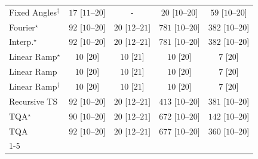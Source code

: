 \begin{tabular}{l|cccc|}
Fixed Angles$^\dagger$ & {\cellcolor[HTML]{F5FBF3}} \color[HTML]{000000} $17$ [$11$--$20$] & {\cellcolor[HTML]{000000}} \color[HTML]{F1F1F1} {\cellcolor{white}} \color{black} - & {\cellcolor[HTML]{F5FBF2}} \color[HTML]{000000} $20$ [$10$--$20$] & {\cellcolor[HTML]{EDF8EA}} \color[HTML]{000000} $59$ [$10$--$20$] \\
Fourier$^\star$ & {\cellcolor[HTML]{E7F6E3}} \color[HTML]{000000} $92$ [$10$--$20$] & {\cellcolor[HTML]{F5FBF2}} \color[HTML]{000000} $20$ [$12$--$21$] & {\cellcolor[HTML]{00441B}} \color[HTML]{F1F1F1} $781$ [$10$--$20$] & {\cellcolor[HTML]{79C67A}} \color[HTML]{000000} $382$ [$10$--$20$] \\
Interp.$^\star$ & {\cellcolor[HTML]{E7F6E3}} \color[HTML]{000000} $92$ [$10$--$20$] & {\cellcolor[HTML]{F5FBF2}} \color[HTML]{000000} $20$ [$12$--$21$] & {\cellcolor[HTML]{00441B}} \color[HTML]{F1F1F1} $781$ [$10$--$20$] & {\cellcolor[HTML]{79C67A}} \color[HTML]{000000} $382$ [$10$--$20$] \\
Linear Ramp$^\star$ & {\cellcolor[HTML]{F7FCF5}} \color[HTML]{000000} $10$ [$20$] & {\cellcolor[HTML]{F7FCF5}} \color[HTML]{000000} $10$ [$21$] & {\cellcolor[HTML]{F7FCF5}} \color[HTML]{000000} $10$ [$20$] & {\cellcolor[HTML]{F7FCF5}} \color[HTML]{000000} $7$ [$20$] \\
Linear Ramp & {\cellcolor[HTML]{F7FCF5}} \color[HTML]{000000} $10$ [$20$] & {\cellcolor[HTML]{F7FCF5}} \color[HTML]{000000} $10$ [$21$] & {\cellcolor[HTML]{F7FCF5}} \color[HTML]{000000} $10$ [$20$] & {\cellcolor[HTML]{F7FCF5}} \color[HTML]{000000} $7$ [$20$] \\
Linear Ramp$^\dagger$ & {\cellcolor[HTML]{F7FCF5}} \color[HTML]{000000} $10$ [$20$] & {\cellcolor[HTML]{F7FCF5}} \color[HTML]{000000} $10$ [$21$] & {\cellcolor[HTML]{F7FCF5}} \color[HTML]{000000} $10$ [$20$] & {\cellcolor[HTML]{F7FCF5}} \color[HTML]{000000} $7$ [$20$] \\
Recursive TS & {\cellcolor[HTML]{E7F6E3}} \color[HTML]{000000} $92$ [$10$--$20$] & {\cellcolor[HTML]{F5FBF2}} \color[HTML]{000000} $20$ [$12$--$21$] & {\cellcolor[HTML]{6ABF71}} \color[HTML]{000000} $413$ [$10$--$20$] & {\cellcolor[HTML]{7AC77B}} \color[HTML]{000000} $381$ [$10$--$20$] \\
TQA$^\star$ & {\cellcolor[HTML]{E8F6E3}} \color[HTML]{000000} $90$ [$10$--$20$] & {\cellcolor[HTML]{F5FBF2}} \color[HTML]{000000} $20$ [$12$--$21$] & {\cellcolor[HTML]{05712F}} \color[HTML]{F1F1F1} $672$ [$10$--$20$] & {\cellcolor[HTML]{DAF0D4}} \color[HTML]{000000} $142$ [$10$--$20$] \\
TQA & {\cellcolor[HTML]{E7F6E3}} \color[HTML]{000000} $92$ [$10$--$20$] & {\cellcolor[HTML]{F5FBF2}} \color[HTML]{000000} $20$ [$12$--$21$] & {\cellcolor[HTML]{026F2E}} \color[HTML]{F1F1F1} $677$ [$10$--$20$] & {\cellcolor[HTML]{84CC83}} \color[HTML]{000000} $360$ [$10$--$20$] \\
\cline{1-5}
\bottomrule
\end{tabular}
